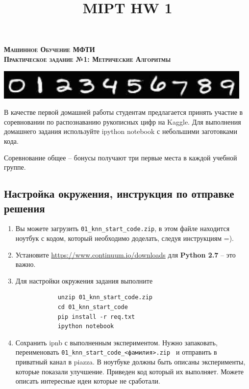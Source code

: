 \documentclass[a4paper, 12pt]{article}
\title{MIPT HW 1}
\begin{document}
  \begin{center}
    \textsc{\textbf{
    	{\Large Машинное Обучение МФТИ \\
        \vspace{0.5cm}
    	Практическое задание №1: Метрические Алгоритмы}}}
  \end{center}

\begin{center}
	\includegraphics[scale=1.0]{mnist}
\end{center}

В качестве первой домашней работы студентам предлагается принять участие в соревновании по распознаванию рукописных цифр на Kaggle. Для выполнения домашнего задания используйте ipython notebook с небольшими заготовками кода.

Соревнование общее -- бонусы получают три первые места в каждой учебной группе.

\subsection*{Настройка окружения, инструкция по отправке решения}
  \begin{enumerate}
	\item Вы можете загрузить \texttt{01\_knn\_start\_code.zip}, в этом файле находится ноутбук с кодом, который необходимо доделать, следуя инструкциям =).
    \item Установите \href{https://www.continuum.io/downloads}{https://www.continuum.io/downloads} для \textbf{Python 2.7} -- это важно. 
    \item Для настройки окружения задания выполните 
        \begin{verbatim}
            unzip 01_knn_start_code.zip 
            cd 01_knn_start_code
            pip install -r req.txt
            ipython notebook
		\end{verbatim}
     \item Сохранить ipnb с выполненным экспериментом. Нужно запаковать, переименовать \texttt{01\_knn\_start\_code\_<фамилия>.zip } и отправить в приватный канал в piazza. В ноутбуке должны быть описаны эксперименты, которые показали улучшение. Приведен код который их выполняет. Можете описать интересные идеи которые не сработали. 
  \end{enumerate}
\end{document}
